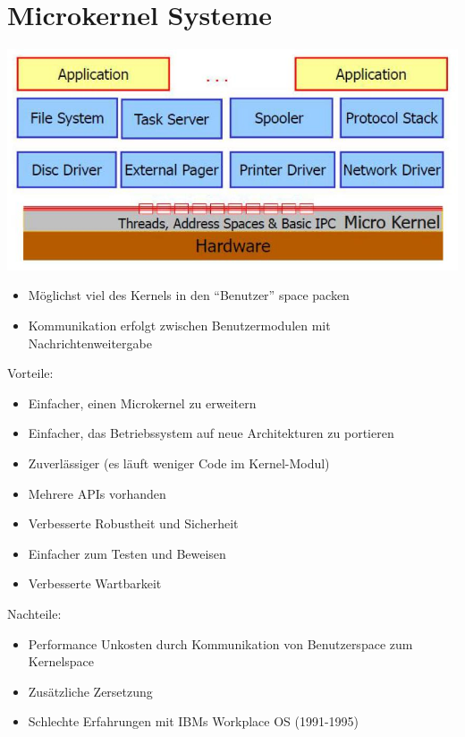 \documentclass[a4paper]{scrreprt}
\begin{document}
\section{Microkernel Systeme}
	\begin{center}
		\includegraphics[scale=0.3]{graphics/microkernel.png}
	\end{center}

	\begin{itemize}
		\item Möglichst viel des Kernels in den "`Benutzer"' space packen
		\item Kommunikation erfolgt zwischen Benutzermodulen mit Nachrichtenweitergabe
	\end{itemize}
	
	Vorteile:
		\begin{itemize}
			\item Einfacher, einen Microkernel zu erweitern
			\item Einfacher, das Betriebssystem auf neue Architekturen zu portieren
			\item Zuverlässiger (es läuft weniger Code im Kernel-Modul)
			\item Mehrere APIs vorhanden
			\item Verbesserte Robustheit und Sicherheit
			\item Einfacher zum Testen und Beweisen
			\item Verbesserte Wartbarkeit
		\end{itemize}
	Nachteile:
		\begin{itemize}
			\item Performance Unkosten durch Kommunikation von Benutzerspace zum Kernelspace 
			\item Zusätzliche Zersetzung
			\item Schlechte Erfahrungen mit IBMs Workplace OS (1991-1995)
		\end{itemize}
\end{document}
